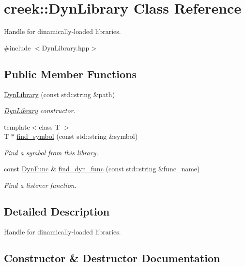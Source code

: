\hypertarget{classcreek_1_1_dyn_library}{}\section{creek\+:\+:Dyn\+Library Class Reference}
\label{classcreek_1_1_dyn_library}


Handle for dinamically-\/loaded libraries.  




{\ttfamily \#include $<$Dyn\+Library.\+hpp$>$}

\subsection*{Public Member Functions}
\begin{DoxyCompactItemize}
\item 
\hyperlink{classcreek_1_1_dyn_library_a9360b9fb5bfa5d0ba409a496e2d47454}{Dyn\+Library} (const std\+::string \&path)
\begin{DoxyCompactList}\small\item\em {\ttfamily \hyperlink{classcreek_1_1_dyn_library}{Dyn\+Library}} constructor. \end{DoxyCompactList}\item 
{\footnotesize template$<$class T $>$ }\\T $\ast$ \hyperlink{classcreek_1_1_dyn_library_a846568dbfc893b86c1e5f736467140a4}{find\+\_\+symbol} (const std\+::string \&symbol)
\begin{DoxyCompactList}\small\item\em Find a symbol from this library. \end{DoxyCompactList}\item 
const \hyperlink{classcreek_1_1_dyn_func}{Dyn\+Func} \& \hyperlink{classcreek_1_1_dyn_library_a24140396609bbc0b22212f1c9d086b13}{find\+\_\+dyn\+\_\+func} (const std\+::string \&func\+\_\+name)
\begin{DoxyCompactList}\small\item\em Find a listener function. \end{DoxyCompactList}\end{DoxyCompactItemize}


\subsection{Detailed Description}
Handle for dinamically-\/loaded libraries. 

\subsection{Constructor \& Destructor Documentation}
